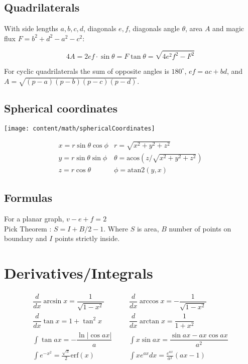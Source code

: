\subsection{Quadrilaterals}
With side lengths $a,b,c,d$, diagonals $e, f$, diagonals angle $\theta$, area $A$ and
magic flux $F=b^2+d^2-a^2-c^2$:

\[ 4A = 2ef \cdot \sin\theta = F\tan\theta = \sqrt{4e^2f^2-F^2} \]

 For cyclic quadrilaterals the sum of opposite angles is $180^\circ$,
$ef = ac + bd$, and $A = \sqrt{(p-a)(p-b)(p-c)(p-d)}$.
\bigskip

\subsection{Spherical coordinates}
\begin{center}
\texttt{[image: content/math/sphericalCoordinates]}
\end{center}
\[\begin{array}{cc}
x = r\sin\theta\cos\phi & r = \sqrt{x^2+y^2+z^2}\\
y = r\sin\theta\sin\phi & \theta = \textrm{acos}(z/\sqrt{x^2+y^2+z^2})\\
z = r\cos\theta & \phi = \textrm{atan2}(y,x)
\end{array}\]
\subsection{Formulas}
For a planar graph, $v - e + f = 2$\\
Pick Theorem : $S = I + B/2-1$. Where $S$ is area, $B$ number of points on boundary and $I$ points strictly inside. 

\section{Derivatives/Integrals}
\begin{align*}
	\dfrac{d}{dx}\arcsin x = \dfrac{1}{\sqrt{1-x^2}} &&& \dfrac{d}{dx}\arccos x = -\dfrac{1}{\sqrt{1-x^2}} \\
	\dfrac{d}{dx}\tan x = 1+\tan^2 x &&& \dfrac{d}{dx}\arctan x = \dfrac{1}{1+x^2} \\
	\int\tan ax = -\dfrac{\ln|\cos ax|}{a} &&& \int x\sin ax = \dfrac{\sin ax-ax \cos ax}{a^2} \\
	\int e^{-x^2} = \frac{\sqrt \pi}{2} \text{erf}(x) &&& \int xe^{ax}dx = \frac{e^{ax}}{a^2}(ax-1)
\end{align*}

